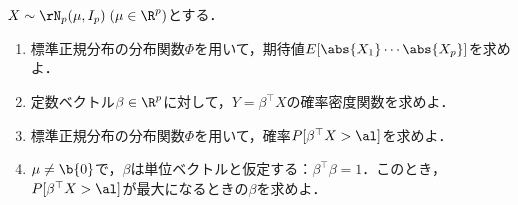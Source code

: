 \documentclass[uplatex,dvipdfmx]{jsarticle}
\begin{document}
\begin{tcolorbox}[colframe=ForestGreen, colback=ForestGreen!10!white,breakable,colbacktitle=ForestGreen!40!white,coltitle=black,fonttitle=\bfseries\sffamily,
    title=第４問]
    \begin{problem}\label{prob-15-1-4}
        $X\sim\rN_p(\mu,I_p)\;(\mu\in\R^p)$とする．
        \begin{enumerate}[{問}1]
            \item 標準正規分布の分布関数$\Phi$を用いて，期待値$E[\abs{X_1}\cdots\abs{X_p}]$を求めよ．
            \item 定数ベクトル$\beta\in\R^p$に対して，$Y=\beta^\top X$の確率密度関数を求めよ．
            \item 標準正規分布の分布関数$\Phi$を用いて，確率$P[\beta^\top X>\al]$を求めよ．
            \item $\mu\ne\b{0}$で，$\beta$は単位ベクトルと仮定する：$\beta^\top\beta=1$．このとき，$P[\beta^\top X>\al]$が最大になるときの$\beta$を求めよ．
        \end{enumerate}
    \end{problem}
\end{tcolorbox}
\end{document}
